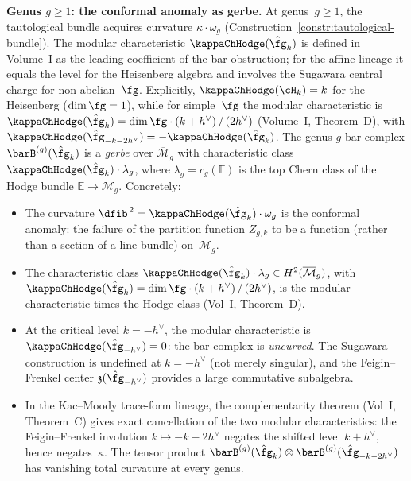 \begin{example}
\medskip\noindent
\textbf{Genus $g \geq 1$: the conformal anomaly as gerbe.}
At genus~$g \geq 1$, the tautological bundle acquires curvature
$\kappa \cdot \omega_g$ (Construction~\ref{constr:tautological-bundle}).
The modular characteristic $\kappaChHodge(\hat{\fg}_k)$ is defined in
Volume~I as the leading coefficient of the bar obstruction; for
the affine lineage it equals the level for the Heisenberg algebra
and involves the Sugawara central charge for non-abelian~$\fg$.
Explicitly, $\kappaChHodge(\cH_k) = k$ for the Heisenberg ($\dim\fg = 1$),
while for simple~$\fg$ the modular characteristic is
$\kappaChHodge(\hat{\fg}_k) = \dim\fg\cdot(k+h^\vee)\,/\,(2h^\vee)$
(Volume~I, Theorem~D), with
$\kappaChHodge(\hat{\fg}_{-k-2h^\vee}) = -\kappaChHodge(\hat{\fg}_k)$. The
genus-$g$ bar complex $\barB^{(g)}(\hat{\fg}_k)$ is a
\emph{gerbe} over $\overline{\mathcal{M}}_g$ with
characteristic class $\kappaChHodge(\hat{\fg}_k) \cdot \lambda_g$, where
$\lambda_g = c_g(\mathbb{E})$ is the top Chern class of the
Hodge bundle $\mathbb{E} \to \overline{\mathcal{M}}_g$.
Concretely:
\begin{itemize}
\item The curvature $\dfib^{\,2} = \kappaChHodge(\hat{\fg}_k) \cdot
 \omega_g$ is the conformal anomaly: the failure of the
 partition function $Z_{g,k}$ to be a function (rather than a
 section of a line bundle) on~$\overline{\mathcal{M}}_g$.
\item The characteristic class
 $\kappaChHodge(\hat{\fg}_k) \cdot \lambda_g \in H^2(\overline{\mathcal{M}}_g)$,
 with $\kappaChHodge(\hat{\fg}_k) = \dim\fg\cdot(k+h^\vee)\,/\,(2h^\vee)$, is
 the modular characteristic times the Hodge class (Vol~I,
 Theorem~D).
\item At the critical level $k = -h^\vee$, the modular
 characteristic is $\kappaChHodge(\hat{\fg}_{-h^\vee}) = 0$:
 the bar complex is \emph{uncurved}.
 The Sugawara construction is undefined at
 $k = -h^\vee$ (not merely singular), and the Feigin--Frenkel
 center $\mathfrak{z}(\hat{\fg}_{-h^\vee})$ provides a large
 commutative subalgebra.
\item In the Kac--Moody trace-form lineage, the complementarity
 theorem (Vol~I, Theorem~C) gives exact cancellation of the two
 modular characteristics: the Feigin--Frenkel involution
 $k\mapsto -k-2h^\vee$ negates the shifted level $k+h^\vee$,
 hence negates~$\kappa$. The tensor product
 $\barB^{(g)}(\hat{\fg}_k) \otimes
 \barB^{(g)}(\hat{\fg}_{-k-2h^\vee})$ has vanishing total
 curvature at every genus.
\end{itemize}
\end{example}

